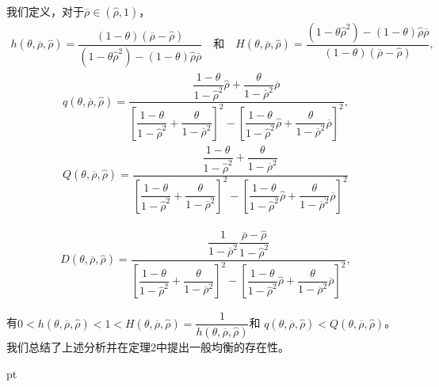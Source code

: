 \documentclass[10.0pt]{article}
\begin{document}
我们定义，对于$ \overline{\rho} \in ({\hat \rho}, 1) $，
\begin{eqnarray*}
h (\theta, \overline{\rho}, {\hat \rho}) = \dfrac{(1 - \theta) (\overline{\rho} - {\hat \rho})}{(1 - \theta {\hat \rho}^2) - (1 - \theta) {\hat \rho} \overline{\rho}} \quad \text{和} \quad H (\theta, \overline{\rho}, {\hat \rho}) = \dfrac{(1 - \theta {\hat \rho}^2) - (1 - \theta) {\hat \rho} \overline{\rho}}{(1 - \theta) (\overline{\rho} - {\hat \rho})},
\end{eqnarray*}
\begin{eqnarray*}
& q (\theta, \overline{\rho}, {\hat \rho}) = \dfrac{\dfrac{1 - \theta}{1 - {\hat \rho}^2} {\hat \rho} + \dfrac{\theta}{1 - \overline{\rho}^2} \overline{\rho}}{\left[ \dfrac{1 - \theta}{1 - {\hat \rho}^2} + \dfrac{\theta}{1 - \overline{\rho}^2} \right]^2 - \left[ \dfrac{1 - \theta}{1 - {\hat \rho}^2} {\hat \rho} + \dfrac{\theta}{1 - \overline{\rho}^2} \overline{\rho} \right]^2}, & \\
& Q (\theta, \overline{\rho}, {\hat \rho}) = \dfrac{\dfrac{1 - \theta}{1 - {\hat \rho}^2} + \dfrac{\theta}{1 - \overline{\rho}^2}}{\left[ \dfrac{1 - \theta}{1 - {\hat \rho}^2} + \dfrac{\theta}{1 - \overline{\rho}^2} \right]^2 - \left[ \dfrac{1 - \theta}{1 - {\hat \rho}^2} {\hat \rho} + \dfrac{\theta}{1 - \overline{\rho}^2} \overline{\rho} \right]^2} &
\end{eqnarray*}

\begin{eqnarray*}
D (\theta, \overline{\rho}, {\hat \rho}) = \dfrac{\dfrac{1}{1 - \overline{\rho}^2} \dfrac{\overline{\rho} - {\hat \rho}}{1 - {\hat \rho}^2}}{\left[ \dfrac{1 - \theta}{1 - {\hat \rho}^2} + \dfrac{\theta}{1 - \overline{\rho}^2} \right]^2 - \left[ \dfrac{1 - \theta}{1 - {\hat \rho}^2} {\hat \rho} + \dfrac{\theta}{1 - \overline{\rho}^2} \overline{\rho} \right]^2},
\end{eqnarray*}


有$ 0 < h (\theta, \overline{\rho}, {\hat \rho}) < 1 < H (\theta, \overline{\rho}, {\hat \rho}) = \dfrac{1}{h (\theta, \overline{\rho}, {\hat \rho})} $和 $ q (\theta, \overline{\rho}, {\hat \rho}) < Q (\theta, \overline{\rho}, {\hat \rho}) $。我们总结了上述分析并在定理2中提出一般均衡的存在性。

 pt
\end{document}
